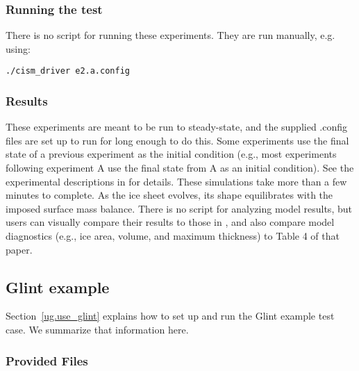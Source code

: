 \subsubsection{Running the test}
There is no script for running these experiments. They are run manually, e.g. using: 

\texttt{./cism\_driver e2.a.config}


\subsubsection{Results}
\label{subsecc:eismint2_results}
These experiments are meant to be run to steady-state, and the supplied .config files are set up to run for long enough to do this.  
Some experiments use the final state of a previous experiment 
as the initial condition (e.g., most experiments following experiment A use the final state from A as an initial condition).  
See the experimental descriptions in \citet{Payne2000} for details.
These simulations take more than a few minutes to complete.
As the ice sheet evolves, its shape equilibrates with the imposed surface mass balance.  
There is no script for analyzing model results, but users can visually compare their results to those in \citet{Payne2000},
and also compare model diagnostics (e.g., ice area, volume, and maximum thickness) to Table 4 of that paper.


\subsection{Glint example}
\label{sec:glint_example}

Section~\ref{ug.use_glint} explains how to set up and run the Glint example test case.
We summarize that information here.

\subsubsection{Provided Files}
\label{subsec:glint_files}

